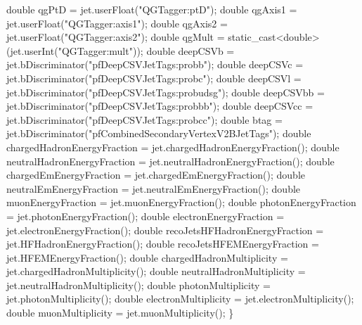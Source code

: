 \begin{DoxyCode}
    \textcolor{keywordtype}{double} qgPtD = jet.userFloat(\textcolor{stringliteral}{"QGTagger:ptD"});
    \textcolor{keywordtype}{double} qgAxis1 = jet.userFloat(\textcolor{stringliteral}{"QGTagger:axis1"});
    \textcolor{keywordtype}{double} qgAxis2 = jet.userFloat(\textcolor{stringliteral}{"QGTagger:axis2"});
    \textcolor{keywordtype}{double} qgMult = \textcolor{keyword}{static\_cast<}\textcolor{keywordtype}{double}\textcolor{keyword}{>}(jet.userInt(\textcolor{stringliteral}{"QGTagger:mult"}));
    \textcolor{keywordtype}{double} deepCSVb = jet.bDiscriminator(\textcolor{stringliteral}{"pfDeepCSVJetTags:probb"});
    \textcolor{keywordtype}{double} deepCSVc = jet.bDiscriminator(\textcolor{stringliteral}{"pfDeepCSVJetTags:probc"});
    \textcolor{keywordtype}{double} deepCSVl = jet.bDiscriminator(\textcolor{stringliteral}{"pfDeepCSVJetTags:probudsg"});
    \textcolor{keywordtype}{double} deepCSVbb = jet.bDiscriminator(\textcolor{stringliteral}{"pfDeepCSVJetTags:probbb"});
    \textcolor{keywordtype}{double} deepCSVcc = jet.bDiscriminator(\textcolor{stringliteral}{"pfDeepCSVJetTags:probcc"});
    \textcolor{keywordtype}{double} btag = jet.bDiscriminator(\textcolor{stringliteral}{"pfCombinedSecondaryVertexV2BJetTags"});
    \textcolor{keywordtype}{double} chargedHadronEnergyFraction = jet.chargedHadronEnergyFraction();
    \textcolor{keywordtype}{double} neutralHadronEnergyFraction = jet.neutralHadronEnergyFraction();
    \textcolor{keywordtype}{double} chargedEmEnergyFraction = jet.chargedEmEnergyFraction();
    \textcolor{keywordtype}{double} neutralEmEnergyFraction = jet.neutralEmEnergyFraction();
    \textcolor{keywordtype}{double} muonEnergyFraction = jet.muonEnergyFraction();
    \textcolor{keywordtype}{double} photonEnergyFraction = jet.photonEnergyFraction();
    \textcolor{keywordtype}{double} electronEnergyFraction = jet.electronEnergyFraction();
    \textcolor{keywordtype}{double} recoJetsHFHadronEnergyFraction = jet.HFHadronEnergyFraction();
    \textcolor{keywordtype}{double} recoJetsHFEMEnergyFraction = jet.HFEMEnergyFraction();
    \textcolor{keywordtype}{double} chargedHadronMultiplicity = jet.chargedHadronMultiplicity();
    \textcolor{keywordtype}{double} neutralHadronMultiplicity = jet.neutralHadronMultiplicity();
    \textcolor{keywordtype}{double} photonMultiplicity = jet.photonMultiplicity();
    \textcolor{keywordtype}{double} electronMultiplicity = jet.electronMultiplicity();
    \textcolor{keywordtype}{double} muonMultiplicity = jet.muonMultiplicity();
\}
\end{DoxyCode}


